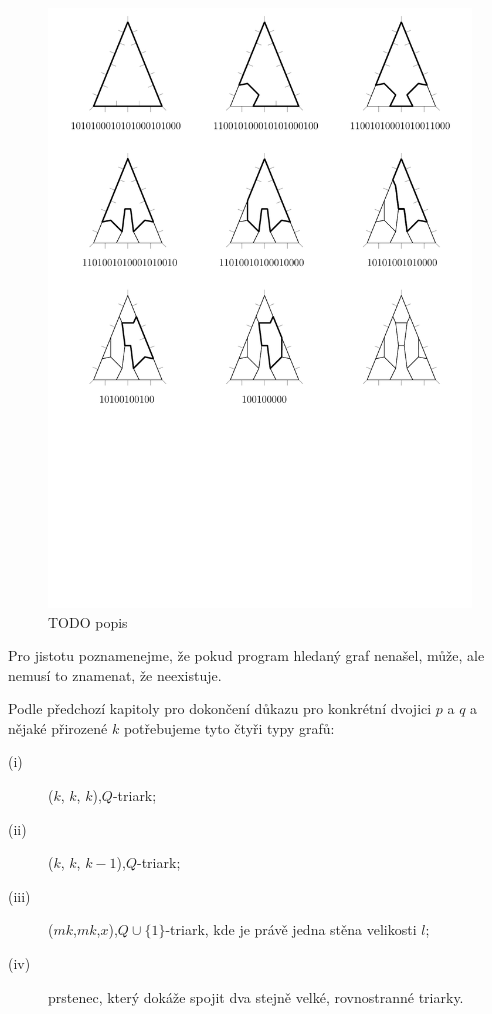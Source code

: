 \begin{figure}[h!]\centering
\includegraphics[width=\textwidth]{../img/reseni}
\caption{TODO popis}
\label{obr03:reseni}
\end{figure}

Pro jistotu poznamenejme, že pokud program hledaný graf nenašel, může, ale nemusí to znamenat, že neexistuje.

Podle předchozí kapitoly pro dokončení důkazu pro konkrétní dvojici $p$ a $q$ a nějaké přirozené $k$ potřebujeme tyto čtyři typy grafů:
\begin{description}
\item[(i)] ($k$, $k$, $k$),$Q$-triark;
\item[(ii)] ($k$, $k$, $k-1$),$Q$-triark;
\item[(iii)] ($mk$,$mk$,$x$),$Q\cup \lbrace 1\rbrace$-triark, kde je právě jedna stěna velikosti $l$;
\item[(iv)] prstenec, který dokáže spojit dva stejně velké, rovnostranné triarky.
\end{description}

